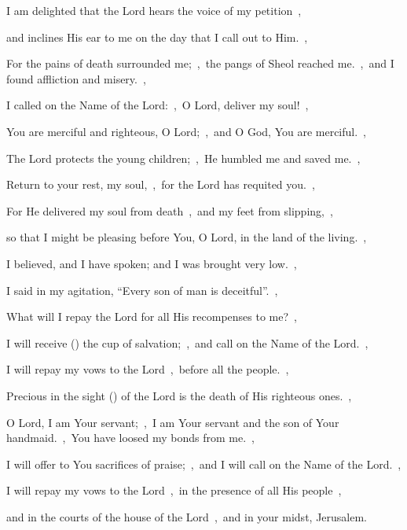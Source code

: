 \documentclass[12pt,twoside,a5paper]{article}
\begin{document}
\begin{normalparskip}
  I am delighted that the Lord hears the voice of my petition~\sep

  and inclines His ear to me on the day that I call out to Him.~\sep


  For the pains of death surrounded me;~\sep\ the pangs of Sheol reached me.~\sep\ and I found affliction and misery.~\sep

  I called on the Name of the Lord:~\sep\ O Lord, deliver my soul!~\sep

  You are merciful and righteous, O Lord;~\sep\ and O God, You are merciful.~\sep

  The Lord protects the young children;~\sep\ He humbled me and saved me.~\sep

  Return to your rest, my soul,~\sep\ for the Lord has requited you.~\sep

  For He delivered my soul from death~\sep\ and my feet from slipping,~\sep

  so that I might be pleasing before You, O Lord, in the land of the living.~\sep

  I believed, and I have spoken; and I was brought very low.~\sep

  I said in my agitation, ``Every son of man is deceitful''.~\sep

  What will I repay the Lord for all His recompenses to me?~\sep

  I will receive () the cup of salvation;~\sep\ and call on the Name of the Lord.~\sep

  I will repay my vows to the Lord~\sep\ before all the people.~\sep

  Precious in the sight () of the Lord is the death of His righteous ones.~\sep

  O Lord, I am Your servant;~\sep\ I am Your servant and the son of Your handmaid.~\sep\ You have loosed my bonds from me.~\sep

  I will offer to You sacrifices of praise;~\sep\ and I will call on the Name of the Lord.~\sep

  I will repay my vows to the Lord~\sep\ in the presence of all His people~\sep

  and in the courts of the house of the Lord~\sep\ and in your midst, Jerusalem.
\end{normalparskip}

\end{document}
